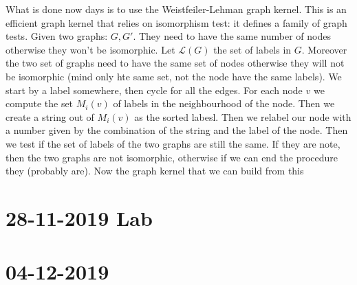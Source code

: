 What is done now days is to use the Weistfeiler-Lehman graph kernel. This is an efficient graph kernel that relies on isomorphism test: it defines a family of graph tests. \newline
Given two graphs: $G, G'$. They need to have the same number of nodes otherwise they won't be isomorphic. Let $\mathcal{L}(G)$ the set of labels in $G$. Moreover the two set of graphs need to have the same set of nodes otherwise they will not be isomorphic (mind only hte same set, not the node have the same labels). We start by a label somewhere, then cycle for all the edges. For each node $v$ we compute the set $M_i(v)$ of labels in the neighbourhood of the node. Then we create a string out of $M_i(v)$ as the sorted labesl. Then we relabel our node with a number given by the combination of the string and the label of the node. Then we test if the set of labels of the two graphs are still the same. If they are note, then the two graphs are not isomorphic, otherwise if we can end the procedure they (probably are). Now the graph kernel that we can build from this 


\chapter{28-11-2019 Lab}
\chapter{04-12-2019}
